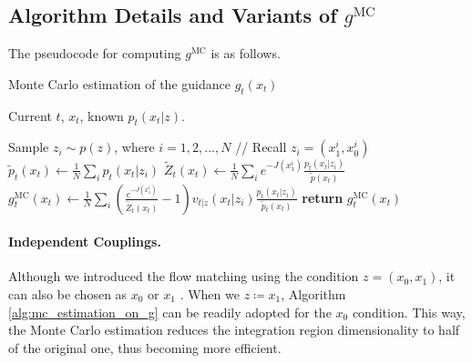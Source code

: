 \subsection{Algorithm Details and Variants of $g^{\text{MC}}$}\label{app:independent_mc}
The pseudocode for computing $g^{\text{MC}}$ is as follows.
\begin{algorithm}[h]
\caption{Monte Carlo estimation of the guidance $g_t(x_t)$}
\label{alg:mc_estimation_on_g}
\begin{algorithmic}[1]
\REQUIRE Current $t$, $x_t$, known $p_t(x_t|z)$.

\STATE Sample $z_i \sim p(z)$, where $i=1,2,...,N$ 
{\color{gray} // Recall $z_i = (x_{1}^i,x_{0}^i)$}
\STATE $\tilde{p}_t(x_t) \gets \frac{1}{N} \sum_i p_t(x_t|z_i)$
\STATE $\tilde{Z}_t(x_t) \gets \frac{1}{N} \sum_i e^{-J(x_{1}^i)} \frac{p_t(x_t|z_i)}{\tilde{p}(x_t)}$
\STATE ${g}^{\text{MC}}_t(x_t) \gets \frac{1}{N} \sum_i (\frac{e^{-J(x_{1}^i)}}{\tilde{Z}_t(x_t)} - 1) v_{t|z}(x_t|z_i) \frac{p_t(x_t|z_i)}{\tilde{p}_t(x_t)}$
\STATE \textbf{return} ${g}^{\text{MC}}_t(x_t)$
\end{algorithmic}
\end{algorithm}

\paragraph{Independent Couplings.}
Although we introduced the flow matching using the condition $z=(x_0,x_1)$, it can also be chosen as $x_0$ or $x_1$ \citep{lipman_flow_2024}. When we $z\coloneqq x_1$, Algorithm \ref{alg:mc_estimation_on_g} can be readily adopted for the $x_0$ condition. This way, the Monte Carlo estimation reduces the integration region dimensionality to half of the original one, thus becoming more efficient. 

